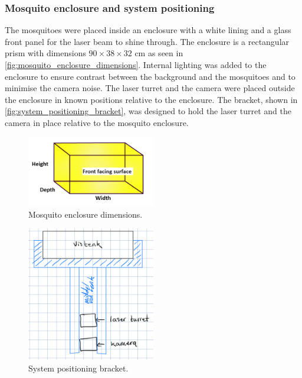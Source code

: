 \subsubsection{Mosquito enclosure and system positioning}
\newcommand{\enclosureWidthCM}{90} %
\newcommand{\enclosureHeightCM}{38} %
\newcommand{\enclosureDepthCM}{32} %

The mosquitoes were placed inside an enclosure with a white lining and a glass front panel for the laser beam to shine through. The enclosure is a rectangular prism with dimensions $\enclosureWidthCM \times \enclosureHeightCM \times \enclosureDepthCM$ cm as seen in \autoref{fig:mosquito_enclosure_dimensions}. Internal lighting was added to the enclosure to ensure contrast between the background and the mosquitoes and to minimise the camera noise. The laser turret and the camera were placed outside the enclosure in known positions relative to the enclosure. The bracket, shown in \autoref{fig:system_positioning_bracket}, was designed to hold the laser turret and the camera in place relative to the mosquito enclosure.

\begin{figure}[h]
    \centering
    \includegraphics[width=0.5\textwidth]{figures/hardware_design/rectangular_prism.png}
    \caption{Mosquito enclosure dimensions.}
    \label{fig:mosquito_enclosure_dimensions}
\end{figure}

\begin{figure}[h]
    \centering
    \includegraphics[width=0.5\textwidth]{figures/hardware_design/positioning_bracket.png}
    \caption{System positioning bracket.}
    \label{fig:system_positioning_bracket}
\end{figure}

